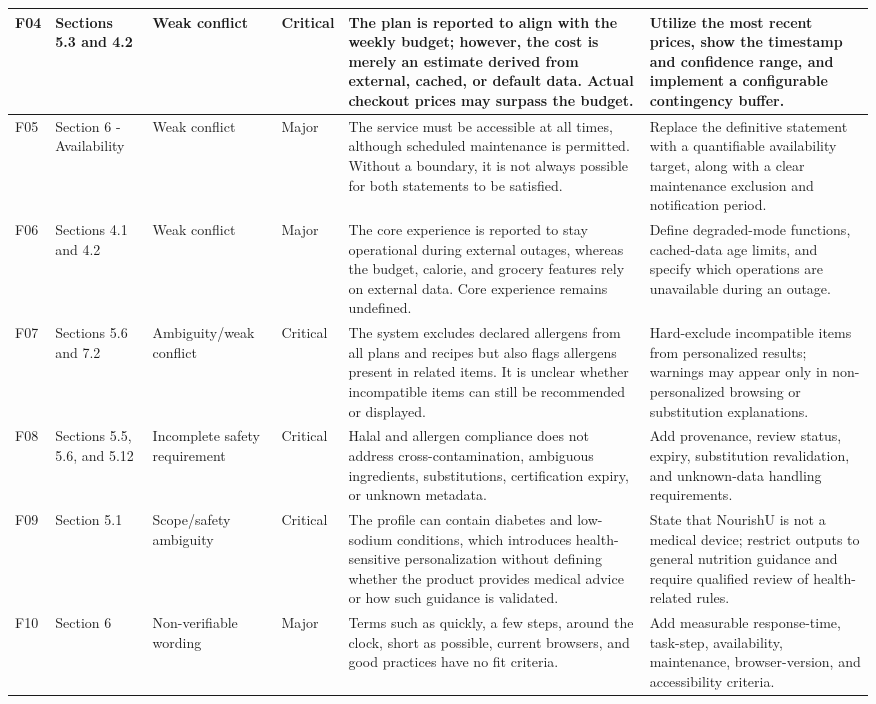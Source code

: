 \documentclass[11pt,a4paper]{article}
\begin{document}
\begin{landscape}
\begin{center}
\begin{longtable}{|p{0.9cm}|p{2.1cm}|p{2.4cm}|p{1.35cm}|p{8.4cm}|p{8.4cm}|}
F04 & Sections 5.3 and 4.2 & Weak conflict & Critical & The plan is reported to align with the weekly budget; however, the cost is merely an estimate derived from external, cached, or default data. Actual checkout prices may surpass the budget. & Utilize the most recent prices, show the timestamp and confidence range, and implement a configurable contingency buffer. \\ \hline
F05 & Section 6 - Availability & Weak conflict & Major & The service must be accessible at all times, although scheduled maintenance is permitted. Without a boundary, it is not always possible for both statements to be satisfied. & Replace the definitive statement with a quantifiable availability target, along with a clear maintenance exclusion and notification period. \\ \hline
F06 & Sections 4.1 and 4.2 & Weak conflict & Major & The core experience is reported to stay operational during external outages, whereas the budget, calorie, and grocery features rely on external data. Core experience remains undefined. & Define degraded-mode functions, cached-data age limits, and specify which operations are unavailable during an outage. \\ \hline
F07 & Sections 5.6 and 7.2 & Ambiguity/weak conflict & Critical & The system excludes declared allergens from all plans and recipes but also flags allergens present in related items. It is unclear whether incompatible items can still be recommended or displayed. & Hard-exclude incompatible items from personalized results; warnings may appear only in non-personalized browsing or substitution explanations. \\ \hline
F08 & Sections 5.5, 5.6, and 5.12 & Incomplete safety requirement & Critical & Halal and allergen compliance does not address cross-contamination, ambiguous ingredients, substitutions, certification expiry, or unknown metadata. & Add provenance, review status, expiry, substitution revalidation, and unknown-data handling requirements. \\ \hline
F09 & Section 5.1 & Scope/safety ambiguity & Critical & The profile can contain diabetes and low-sodium conditions, which introduces health-sensitive personalization without defining whether the product provides medical advice or how such guidance is validated. & State that NourishU is not a medical device; restrict outputs to general nutrition guidance and require qualified review of health-related rules. \\ \hline
F10 & Section 6 & Non-verifiable wording & Major & Terms such as quickly, a few steps, around the clock, short as possible, current browsers, and good practices have no fit criteria. & Add measurable response-time, task-step, availability, maintenance, browser-version, and accessibility criteria. \\ \hline

\end{longtable}
\end{center}
\end{landscape}
\end{document}
